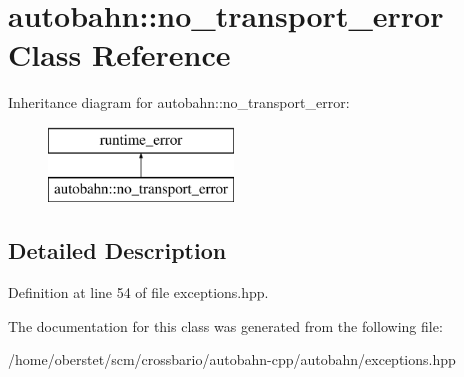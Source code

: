 \hypertarget{classautobahn_1_1no__transport__error}{}\section{autobahn\+:\+:no\+\_\+transport\+\_\+error Class Reference}
\label{classautobahn_1_1no__transport__error}
Inheritance diagram for autobahn\+:\+:no\+\_\+transport\+\_\+error\+:\begin{figure}[H]
\begin{center}
\leavevmode
\includegraphics[height=2.000000cm]{classautobahn_1_1no__transport__error}
\end{center}
\end{figure}


\subsection{Detailed Description}


Definition at line 54 of file exceptions.\+hpp.



The documentation for this class was generated from the following file\+:\begin{DoxyCompactItemize}
\item 
/home/oberstet/scm/crossbario/autobahn-\/cpp/autobahn/exceptions.\+hpp\end{DoxyCompactItemize}
